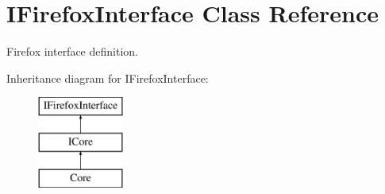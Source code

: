 \hypertarget{classefb_1_1IFirefoxInterface}{
\section{IFirefoxInterface Class Reference}
\label{classefb_1_1IFirefoxInterface}
}


Firefox interface definition.  


Inheritance diagram for IFirefoxInterface:\begin{figure}[H]
\begin{center}
\leavevmode
\includegraphics[height=3.000000cm]{classefb_1_1IFirefoxInterface}
\end{center}
\end{figure}
